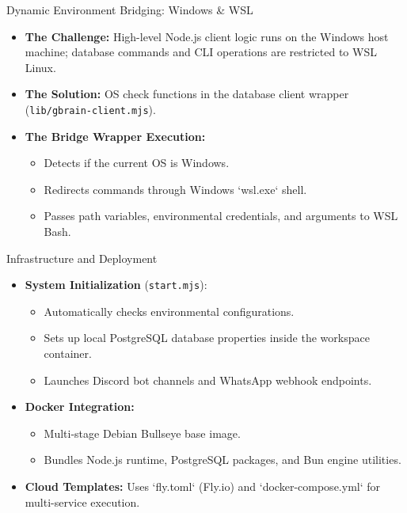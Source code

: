 \documentclass[10pt]{beamer}
\begin{document}
\begin{frame}{Dynamic Environment Bridging: Windows \& WSL}
  \begin{itemize}
    \item \textbf{The Challenge:} High-level Node.js client logic runs on the Windows host machine; database commands and CLI operations are restricted to WSL Linux.
    \item \textbf{The Solution:} OS check functions in the database client wrapper (\texttt{lib/gbrain-client.mjs}).
    \item \textbf{The Bridge Wrapper Execution:}
      \begin{itemize}
        \item Detects if the current OS is Windows.
        \item Redirects commands through Windows `wsl.exe` shell.
        \item Passes path variables, environmental credentials, and arguments to WSL Bash.
      \end{itemize}
  \end{itemize}
\end{frame}

\begin{frame}{Infrastructure and Deployment}
  \begin{itemize}
    \item \textbf{System Initialization} (\texttt{start.mjs}):
      \begin{itemize}
        \item Automatically checks environmental configurations.
        \item Sets up local PostgreSQL database properties inside the workspace container.
        \item Launches Discord bot channels and WhatsApp webhook endpoints.
      \end{itemize}
    \item \textbf{Docker Integration:}
      \begin{itemize}
        \item Multi-stage Debian Bullseye base image.
        \item Bundles Node.js runtime, PostgreSQL packages, and Bun engine utilities.
      \end{itemize}
    \item \textbf{Cloud Templates:} Uses `fly.toml` (Fly.io) and `docker-compose.yml` for multi-service execution.
  \end{itemize}
\end{frame}
\end{document}
